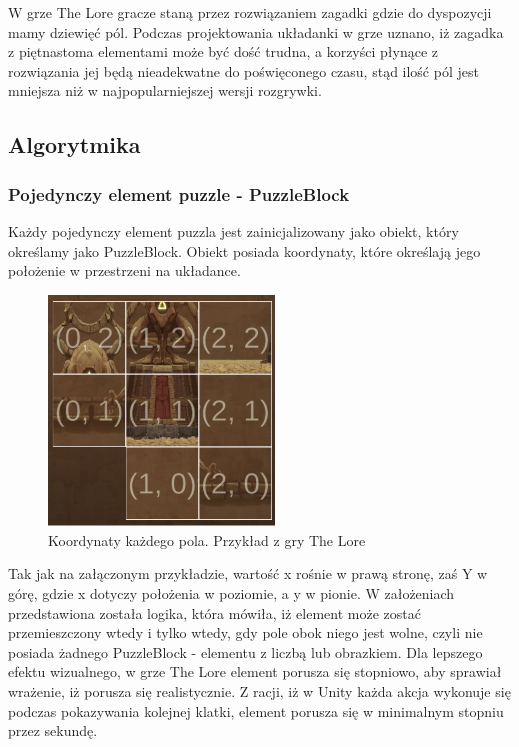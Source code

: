 \documentclass[oneside,polski,logo]{amuthesis}
\begin{document}
W grze The Lore gracze staną przez rozwiązaniem zagadki gdzie do dyspozycji mamy dziewięć pól. Podczas projektowania układanki w grze uznano, iż zagadka z piętnastoma elementami może być dość trudna, a korzyści płynące z rozwiązania jej będą nieadekwatne do poświęconego czasu, stąd ilość pól jest mniejsza niż w najpopularniejszej wersji rozgrywki.
\subsection{Algorytmika}
\subsubsection{Pojedynczy element puzzle - PuzzleBlock}

Każdy pojedynczy element puzzla jest zainicjalizowany jako obiekt, który określamy jako PuzzleBlock. Obiekt posiada koordynaty, które określają jego położenie w przestrzeni na układance.

\begin{figure}[h]
	\centering
	\includegraphics[width=6cm]{images/tyrek/coord_puzzle.png}
	\caption{Koordynaty każdego pola. Przykład z gry The Lore}
\end{figure}

Tak jak na załączonym przykładzie, wartość x rośnie w prawą stronę, zaś Y w górę, gdzie x dotyczy położenia w poziomie, a y w pionie. W założeniach przedstawiona została logika, która mówiła, iż element może zostać przemieszczony wtedy i tylko wtedy, gdy pole obok niego jest wolne, czyli nie posiada żadnego PuzzleBlock - elementu z liczbą lub obrazkiem. Dla lepszego efektu wizualnego, w grze The Lore element porusza się stopniowo, aby sprawiał wrażenie, iż porusza się realistycznie. Z racji, iż w Unity każda akcja wykonuje się podczas pokazywania kolejnej klatki, element porusza się w minimalnym stopniu przez sekundę. 
\end{document}
